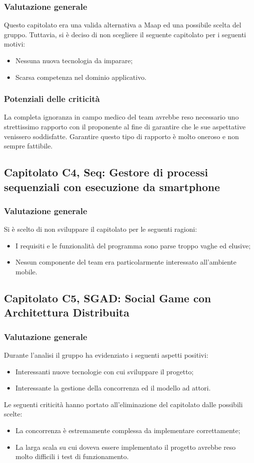 \subsubsection{Valutazione generale} 
Questo capitolato era una valida alternativa a Maap ed una possibile scelta del gruppo. Tuttavia, si è deciso di non scegliere il seguente capitolato per i seguenti motivi:
\begin{itemize}
\item Nessuna nuova tecnologia da imparare;
\item Scarsa competenza nel dominio applicativo.
\end{itemize}
\subsubsection{Potenziali delle criticità} 
La completa ignoranza in campo medico del team avrebbe reso necessario uno strettissimo rapporto con il proponente al fine di garantire che le sue aspettative venissero soddisfatte. Garantire questo tipo di rapporto è molto oneroso e non sempre fattibile.
\subsection{Capitolato C4,  Seq: Gestore di processi sequenziali con esecuzione da smartphone} 
\label{3.3}
\subsubsection{Valutazione generale} 
Si è scelto di non sviluppare il capitolato per le seguenti ragioni:
\begin{itemize}
\item I requisiti e le funzionalità del programma sono parse troppo vaghe ed elusive;
\item Nessun componente del team era particolarmente interessato all’ambiente mobile.
\end{itemize}
\subsection{Capitolato C5,  SGAD: Social Game con Architettura Distribuita} 
\label{3.5}
\subsubsection{Valutazione generale} 
Durante l’analisi il gruppo ha evidenziato i seguenti aspetti positivi:
\begin{itemize}
\item Interessanti nuove tecnologie con cui sviluppare il progetto;
\item Interessante la gestione della concorrenza ed il modello ad attori.
\end{itemize}
Le seguenti criticità hanno portato all’eliminazione del capitolato dalle possibili scelte:
\begin{itemize}
\item La concorrenza è estremamente complessa da implementare correttamente;
\item La larga scala su cui doveva essere implementato il progetto avrebbe reso molto difficili i test di funzionamento.
\end{itemize}
